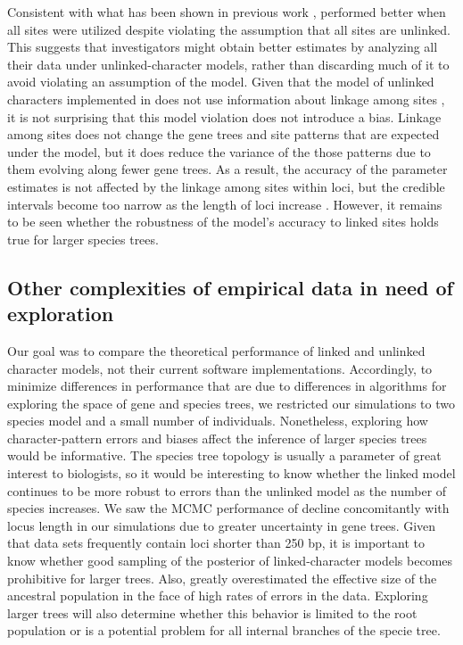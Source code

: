 Consistent with what has been shown in previous work
\citep{Oaks2018ecoevolity,oaks2019comparative},
\ecoevolity performed better when all sites were utilized despite violating the
assumption that all sites are unlinked.
This suggests that investigators might obtain better estimates by analyzing all
their data under unlinked-character models, rather than discarding much of it
to avoid violating an assumption of the model.
Given that the model of unlinked characters implemented in \ecoevolity
does not use information about linkage among sites 
\citep{bryantInferringSpeciesTrees2012, Oaks2018ecoevolity},
it is not surprising that this model violation does not introduce a bias.
Linkage among sites does not change the gene trees and site patterns that are
expected under the model, but it does reduce the variance of the those patterns
due to them evolving along fewer gene trees.
As a result, the accuracy of the parameter estimates is not affected
by the linkage among sites within loci, but the credible intervals
become too narrow as the length of loci increase
\citep{Oaks2018ecoevolity,oaks2019comparative}.
However, it remains to be seen whether the robustness of the model's accuracy
to linked sites holds true for larger species trees.


\subsection{Other complexities of empirical data in need of exploration}
Our goal was to compare the theoretical performance of linked and unlinked
character models, not their current software implementations.
Accordingly, to minimize differences in performance that are due to differences
in algorithms for exploring the space of gene and species trees, we restricted
our simulations to two species model and a small number of individuals.
Nonetheless, exploring how character-pattern errors and biases affect
the inference of larger species trees would be informative.
The species tree topology is usually a parameter of great interest to
biologists, so it would be interesting to know whether 
the linked model continues to be more robust to errors than the unlinked 
model as the number of species increases.
We saw the MCMC performance of \beast decline concomitantly with locus length
in our simulations due to greater uncertainty in gene trees.
Given that data sets frequently contain loci shorter than 250 bp, it is
important to know whether good sampling of the posterior of linked-character
models becomes prohibitive for larger trees.
Also, \ecoevolity greatly overestimated the effective size of the ancestral
population in the face of high rates of errors in the data.
Exploring larger trees will also determine whether this behavior is limited to
the root population or is a potential problem for all internal branches of the
specie tree.

